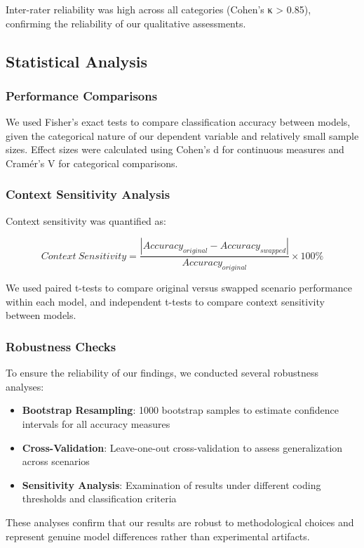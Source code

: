 Inter-rater reliability was high across all categories (Cohen's κ > 0.85), confirming the reliability of our qualitative assessments.

\subsection{Statistical Analysis}
\label{subsec:statistical_analysis}

\subsubsection{Performance Comparisons}

We used Fisher's exact tests to compare classification accuracy between models, given the categorical nature of our dependent variable and relatively small sample sizes. Effect sizes were calculated using Cohen's d for continuous measures and Cramér's V for categorical comparisons.

\subsubsection{Context Sensitivity Analysis}

Context sensitivity was quantified as:

\begin{equation}
Context\ Sensitivity = \frac{|Accuracy_{original} - Accuracy_{swapped}|}{Accuracy_{original}} \times 100\%
\end{equation}

We used paired t-tests to compare original versus swapped scenario performance within each model, and independent t-tests to compare context sensitivity between models.

\subsubsection{Robustness Checks}

To ensure the reliability of our findings, we conducted several robustness analyses:

\begin{itemize}
    \item \textbf{Bootstrap Resampling}: 1000 bootstrap samples to estimate confidence intervals for all accuracy measures
    
    \item \textbf{Cross-Validation}: Leave-one-out cross-validation to assess generalization across scenarios
    
    \item \textbf{Sensitivity Analysis}: Examination of results under different coding thresholds and classification criteria
\end{itemize}

These analyses confirm that our results are robust to methodological choices and represent genuine model differences rather than experimental artifacts. 